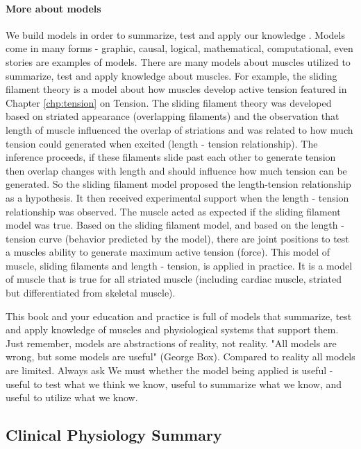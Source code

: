 \paragraph{More about models}

We build models in order to summarize, test and apply our knowledge \cite{collins_synthesis_2018}. Models come in many forms - graphic, causal, logical, mathematical, computational, even stories are examples of models. There are many models about muscles utilized to summarize, test and apply knowledge about muscles. For example, the sliding filament theory is a model about how muscles develop active tension featured in Chapter \ref{chp:tension} on Tension. The sliding filament theory was developed based on striated appearance (overlapping filaments) and the observation that length of muscle influenced the overlap of striations and was related to how much tension could generated when excited (length - tension relationship). The inference proceeds, if these filaments slide past each other to generate tension then overlap changes with length and should influence how much tension can be generated. So the sliding filament model proposed the length-tension relationship as a hypothesis. It then received experimental support when the length - tension relationship was observed. The muscle acted as expected if the sliding filament model was true. Based on the sliding filament model, and based on the length - tension curve (behavior predicted by the model), there are joint positions to test a muscles ability to generate maximum active tension (force). This model of muscle, sliding filaments and length - tension, is applied in practice. It is a model of muscle that is true for all striated muscle (including cardiac muscle, striated but differentiated from skeletal muscle).

This book and your education and practice is full of models that summarize, test and apply knowledge of muscles and physiological systems that support them. Just remember, models are abstractions of reality, not reality. "All models are wrong, but some models are useful" (George Box). Compared to reality all models are limited. Always ask We must whether the model being applied is useful - useful to test what we think we know, useful to summarize what we know, and useful to utilize what we know.

\subsection{Clinical Physiology Summary}

